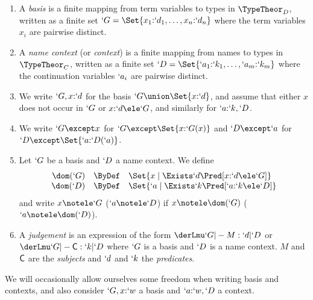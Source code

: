 \documentclass{CSML}
\begin{document}
 \begin{defi} \hfill
 \begin{enumerate}
 \item
A \emph{basis} is a finite mapping from term variables to types in $\TypeTheor_D$, written as a finite set $`G = \Set{x_1{:}`d_1, \ldots,x_n{:}`d_n}$ where the term variables $x_i$ are pairwise distinct.

 \item
A \emph{name context} (or \emph{context}) is a finite mapping from names to types in $\TypeTheor_C$, written as a finite set $`D = \Set{`a_1{:}`k_1, \ldots, `a_m{:}`k_m}$ where the continuation variables $`a_i$ are pairwise distinct.

 \item
We write $`G,x{:}`d$ for the basis $`G \union \Set{x{:}`d}$, and assume that either $x$ does not occur in $`G$ or $x{:}`d \ele `G$, and similarly for $`a{:}`k,`D $.

 \item
We write $`G \except x $ for $`G \except \Set{x{:}`G(x)}$ and $`D \except `a$ for $`D \except \Set{`a{:}`D(`a)}$.

 \item \label{def:ext-leq-i}
Let $`G$ be a basis and $`D $ a name context. We define 
%
 \[ \begin{array}{rcl}
 \dom(`G) &\ByDef& \Set{x \mid \Exists `d  \Pred[ x{:}`d \ele `G] }
 \\ %
 \dom(`D) &\ByDef& \Set{`a \mid \Exists `k  \Pred[ `a{:}`k \ele `D] }
 \end{array} \]
and write $x \notele `G$ ($`a \notele `D $) if $x \notele \dom(`G)$ ($`a \notele \dom(`D)$).

 \item
A \emph{judgement} is an expression of the form $ \derLmu `G |- M : `d | `D $ or $ \derLmu `G |- {\Cmd} : `k | `D $ where $`G$ is a basis and $`D $ is a name context.
$M$ and $\textrm{\sf C}$ are the \emph{subjects} and $`d$ and $`k$ the \emph{predicates}.

 \end{enumerate}
 \end{defi}
\noindent
We will occasionally allow ourselves some freedom when writing basis and contexts, and also consider $`G,x{:}`w$ a basis and $`a{:}`w,`D $ a context.
\end{document}
